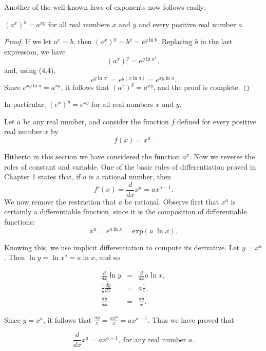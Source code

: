 Another of the well-known laws of exponents now follows easily: 

\begin{theorem} %
$(a^x)^y = a^{xy}$ for all real numbers $x$ and $y$ and every positive real number $a$.
\end{theorem}

\begin{proof}
If we let $a^x = b$, then $(a^x)^y = b^y = e^{y \ln b}$. Replacing $b$ in the last expression, we have
$$
(a^x)^y = e^{y \ln a^x},
$$
and, using (4.4), 
$$
e^{y \ln a^x}  = e^{y(x \ln a)} = e^{xy \ln a}.
$$
Since $e^{xy \ln a} = a^{xy}$, it follows that $(a^x)^y = a^{xy}$, and the proof is complete.
\end{proof}

In particular, $(e^x)^y = e^{xy}$ for all real numbers $x$ and $y$.

Let $a$ be any real number, and consider the function $f$ defined for every positive real number $x$ by
$$
f(x) = x^{a}.
$$

\noindent Hitherto in this section we have considered the function $a^x$. Now we reverse the roles of constant and variable. One of the basic rules of differentiation proved in Chapter 1 states that, if $a$ is a rational number, then
$$
f'(x) = \frac{d}{dx} x^a = ax^{a - 1}.
$$
\noindent We now remove the restriction that $a$ be rational. Observe first that $x^a$ is certainly a differentiable function, since it is the composition of differentiable functions:
$$
x^a= e^{a \ln x} = \mbox{exp} (a\; \ln x).
$$

\noindent Knowing this, we use implicit differentiation to compute its derivative. Let $y = x^a$. Then $\ln y = \ln x^a = a \ln x$, and so

\begin{eqnarray*}
             \frac{d}{dx} \ln y &=& \frac{d}{dx} a \ln x,\\
              \frac{1}{y} \frac{dy}{dx} &=& a \frac{1}{x},\\
                          \frac{dy}{dx} &=& \frac{ay}{x}.
\end{eqnarray*}

\noindent Since $y = x^a$, it follows that $\frac{ay}{x}=\frac{ax^a}{x}= ax^{a-1}$. Thus we have proved that

\begin{theorem}
\label{thm 5.4.6}
$$
\frac{d}{dx}x^a = ax^{a-1}, \; \mbox{for any real number $a$}.  
$$
\end{theorem}

